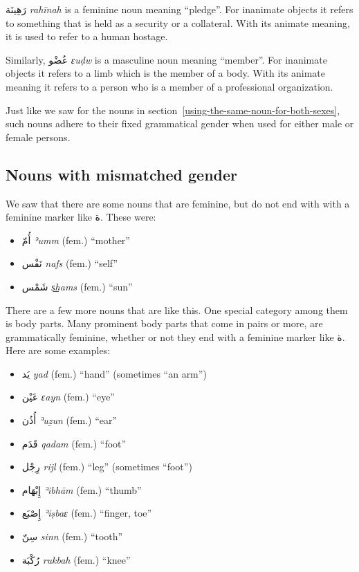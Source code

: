 \documentclass[
  10pt,
]{book}
\providecommand{\tightlist}{%
  \setlength{\itemsep}{0pt}\setlength{\parskip}{0pt}}
\begin{document}
\foreignlanguage{arabic}{رَهِينَة} \emph{rahīnah} is a feminine noun meaning \enquote{pledge}. For inanimate objects it refers to something that is held as a security or a collateral. With its animate meaning, it is used to refer to a human hostage.

Similarly,
\foreignlanguage{arabic}{عُضْو} \emph{ɛuḍw} is a masculine noun meaning \enquote{member}. For inanimate objects it refers to a limb which is the member of a body. With its animate meaning it refers to a person who is a member of a professional organization.

Just like we saw for the nouns in section~\ref{using-the-same-noun-for-both-sexes},
such nouns adhere to their fixed grammatical gender when used for either male or female persons.

\subsection{Nouns with mismatched gender}\label{nouns-with-mismatched-gender}

We saw that there are some nouns that are feminine, but do not end with with a feminine marker like \foreignlanguage{arabic}{ة}. These were:

\begin{itemize}
\tightlist
\item
  \foreignlanguage{arabic}{أُمّ} \emph{ʾumm} (fem.) \enquote{mother}
\item
  \foreignlanguage{arabic}{نَفْس} \emph{nafs} (fem.) \enquote{self}
\item
  \foreignlanguage{arabic}{شَمْس} \emph{s͟hams} (fem.) \enquote{sun}
\end{itemize}

There are a few more nouns that are like this. One special category among them is body parts. Many prominent body parts that come in pairs or more, are grammatically feminine, whether or not they end with a feminine marker like \foreignlanguage{arabic}{ة}. Here are some examples:

\begin{itemize}
\tightlist
\item
  \foreignlanguage{arabic}{يَد} \emph{yad} (fem.) \enquote{hand} (sometimes \enquote{an arm})
\item
  \foreignlanguage{arabic}{عَيْن} \emph{ɛayn} (fem.) \enquote{eye}
\item
  \foreignlanguage{arabic}{أُذُن} \emph{ʾuẕun} (fem.) \enquote{ear}
\item
  \foreignlanguage{arabic}{قَدَم} \emph{qadam} (fem.) \enquote{foot}
\item
  \foreignlanguage{arabic}{رِجْل} \emph{rijl} (fem.) \enquote{leg} (sometimes \enquote{foot})
\item
  \foreignlanguage{arabic}{إِبْهَام} \emph{ʾibhām} (fem.) \enquote{thumb}
\item
  \foreignlanguage{arabic}{إِصْبَع} \emph{ʾiṣbaɛ} (fem.) \enquote{finger, toe}
\item
  \foreignlanguage{arabic}{سِنّ} \emph{sinn} (fem.) \enquote{tooth}
\item
  \foreignlanguage{arabic}{رُکْبَة} \emph{rukbah} (fem.) \enquote{knee}
\end{itemize}
\end{document}
